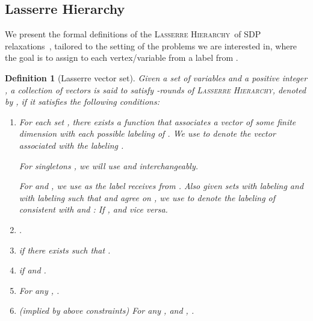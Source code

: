 \documentclass{article}
\newtheorem{definition}{Definition}[section]
\newcommand{\lh}{\textsc{\sf Lasserre Hierarchy}}
\def\ngap{}
\begin{document}
\subsection{Lasserre Hierarchy}
\label{sec:lasserre-defn}
We present the formal definitions of the \lh\ of SDP
relaxations~\cite{Las02}, tailored to the setting of the problems we
are interested in, where the goal is to assign to each vertex/variable
from  a label from .
\def\dim{\Upsilon}
\begin{definition}[Lasserre vector set]
\label{def:las-sdp}
Given a set of variables  and a positive integer , a collection
of vectors  is said to satisfy -rounds of \lh, denoted by
, if it satisfies the following conditions:
\begin{enumerate}
\item For each set , there exists a function
   that associates a vector of some
  finite dimension  with each possible labeling of .  We use
   to denote the vector associated with the labeling .

  For singletons , we will use  and 
  interchangeably.

  For  and , we use  as the label 
  receives from .  Also given sets  with labeling  and  with labeling  such that  and
   agree on , we use  to denote the labeling of
   consistent with  and : If ,  and vice versa.
\item .
\item  if there exists
   such that .
\item \label{def:las-sdp:consistent}  if
   and .
\item For any , .
\item (implied by above constraints) For any ,
   and , .
\end{enumerate} 
\end{definition}
\ngap
\end{document}
